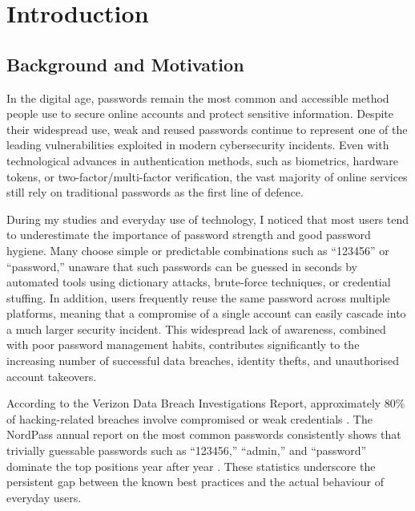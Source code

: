 
\chapter{Introduction}

\section{Background and Motivation}

In the digital age, passwords remain the most common and accessible method people use to secure online accounts and protect sensitive information. Despite their widespread use, weak and reused passwords continue to represent one of the leading vulnerabilities exploited in modern cybersecurity incidents. Even with technological advances in authentication methods, such as biometrics, hardware tokens, or two-factor/multi-factor verification, the vast majority of online services still rely on traditional passwords as the first line of defence.

During my studies and everyday use of technology, I noticed that most users tend to underestimate the importance of password strength and good password hygiene. Many choose simple or predictable combinations such as ``123456'' or ``password,'' unaware that such passwords can be guessed in seconds by automated tools using dictionary attacks, brute-force techniques, or credential stuffing. In addition, users frequently reuse the same password across multiple platforms, meaning that a compromise of a single account can easily cascade into a much larger security incident. This widespread lack of awareness, combined with poor password management habits, contributes significantly to the increasing number of successful data breaches, identity thefts, and unauthorised account takeovers.

According to the Verizon Data Breach Investigations Report, approximately 80\% of hacking-related breaches involve compromised or weak credentials \cite{verizon2024}. The NordPass annual report on the most common passwords consistently shows that trivially guessable passwords such as ``123456,'' ``admin,'' and ``password'' dominate the top positions year after year \cite{nordpass2024}. These statistics underscore the persistent gap between the known best practices and the actual behaviour of everyday users.

